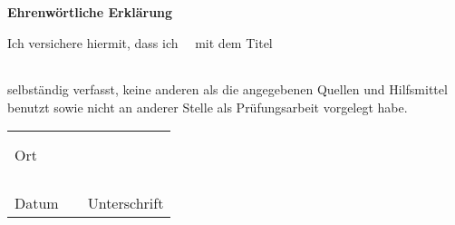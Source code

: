 \pagestyle{plain}


\textbf{{\Large Ehrenwörtliche Erklärung}}
\vspace{2cm}

  {\newcommand{\DocumentArticle}{meinen}}
  {
      {\newcommand{\DocumentWord}{meine}}
      {
          {\newcommand{\DocumentArticle}{meine}}
          {\newcommand{\DocumentArticle}{meine/n}}
      }
  }

Ich versichere hiermit, dass ich \DocumentArticle\ \DocumentType \ mit dem Titel
\vspace{1cm}

\begin{tabular*}{\linewidth}{@{\extracolsep{\fill}}ccc}
 \\ \hline
 \vspace{2cm}
 \\ \hline
\end{tabular*}
\vspace{2cm}

selbständig verfasst, keine anderen als die angegebenen Quellen und Hilfsmittel benutzt
sowie nicht an anderer Stelle als Prüfungsarbeit vorgelegt habe.
\vfill

\begin{table*}[hp]
  \centering
  \begin{tabular}{L{6cm}L{2cm}L{6cm}}
    & & \\
    & & \\ 
    Ort &  \\
    & & \\
    & & \\
    & & \\
    & &  \\  
    Datum & & Unterschrift \\
  \end{tabular}
\end{table*}